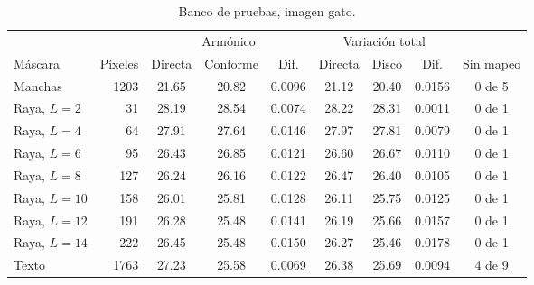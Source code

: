 \begin{table}[ht]
  \centering
  \caption{Banco de pruebas, imagen gato.}
  \label{tab:anexo-gato}
  \small
  \begin{tabular}{@{}lrccccccc@{}}
    \toprule
    & & \multicolumn{3}{c}{Armónico} & \multicolumn{3}{c}{Variación total} & \\
    \cmidrule(lr){3-5}\cmidrule(lr){6-8}
    Máscara & Píxeles & Directa & Conforme & Dif. & Directa & Disco & Dif. & Sin mapeo \\
    \midrule
    Manchas & 1203 & 21.65 & 20.82 & 0.0096 & 21.12 & 20.40 & 0.0156 & 0 de 5 \\
    Raya, $L=2$ & 31 & 28.19 & 28.54 & 0.0074 & 28.22 & 28.31 & 0.0011 & 0 de 1 \\
    Raya, $L=4$ & 64 & 27.91 & 27.64 & 0.0146 & 27.97 & 27.81 & 0.0079 & 0 de 1 \\
    Raya, $L=6$ & 95 & 26.43 & 26.85 & 0.0121 & 26.60 & 26.67 & 0.0110 & 0 de 1 \\
    Raya, $L=8$ & 127 & 26.24 & 26.16 & 0.0122 & 26.47 & 26.40 & 0.0105 & 0 de 1 \\
    Raya, $L=10$ & 158 & 26.01 & 25.81 & 0.0128 & 26.11 & 25.75 & 0.0125 & 0 de 1 \\
    Raya, $L=12$ & 191 & 26.28 & 25.48 & 0.0141 & 26.19 & 25.66 & 0.0157 & 0 de 1 \\
    Raya, $L=14$ & 222 & 26.45 & 25.48 & 0.0150 & 26.27 & 25.46 & 0.0178 & 0 de 1 \\
    Texto & 1763 & 27.23 & 25.58 & 0.0069 & 26.38 & 25.69 & 0.0094 & 4 de 9 \\
    \bottomrule
  \end{tabular}
  \propia
\end{table}
